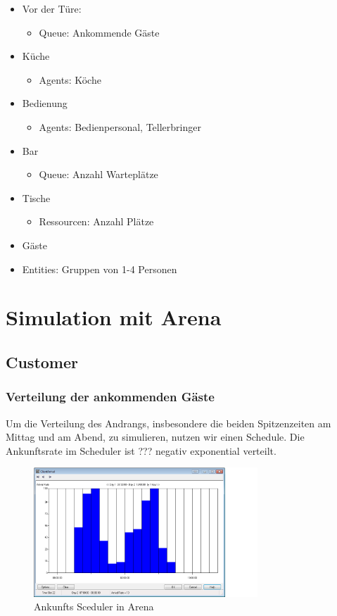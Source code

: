 \documentclass[ngerman,a4paper,12pt]{scrreprt}
\begin{document}
			\begin{itemize}
		\item Vor der Türe:
			\begin{itemize}
				\item Queue: Ankommende Gäste
			\end{itemize}
		\item Küche
			\begin{itemize}
				\item Agents: Köche
			\end{itemize}
		\item Bedienung
			\begin{itemize}
				\item Agents: Bedienpersonal, Tellerbringer
			\end{itemize}
		\item Bar
			\begin{itemize}
				\item Queue: Anzahl Warteplätze
			\end{itemize}
		\item Tische
			\begin{itemize}
				\item Ressourcen: Anzahl Plätze
			\end{itemize}
	\end{itemize}
	\begin{itemize}
		\item Gäste
		\item Entities: Gruppen von 1-4 Personen 
	\end{itemize}


\chapter{Simulation mit Arena}
	\section{Customer}			
		\subsection{Verteilung der ankommenden Gäste}
			Um die Verteilung des Andrangs, insbesondere die beiden Spitzenzeiten am Mittag und am Abend, zu simulieren, nutzen wir einen Schedule.	
			Die Ankunftsrate im Scheduler ist ??? negativ exponential verteilt.
	
			\begin{figure}[H]
				\centering
					\includegraphics[width=0.75\textwidth]{img/scheduler.png}
					\caption[Arrival Sceduler in Arena]{Ankunfts Sceduler in Arena}
					\label{arrivalSceduler}
			\end{figure}
	
\end{document}
